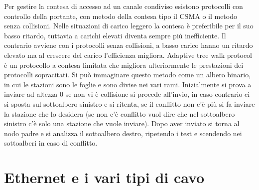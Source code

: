 Per gestire la contesa di accesso ad un canale condiviso esistono protocolli con controllo della portante, con metodo della contesa tipo il CSMA o il metodo senza collisioni. Nelle situazioni di carico leggero la contesa è preferibile per il suo basso ritardo, tuttavia a carichi elevati diventa sempre più inefficiente. Il contrario avviene con i protocolli senza collisioni, a basso carico hanno un ritardo elevato ma al crescere del carico l’efficienza migliora.
Adaptive tree walk protocol è un protocollo a contesa limitata che migliora ulteriormente le prestazioni dei protocolli sopracitati.
Si può immaginare questo metodo come un albero binario, in cui le stazioni sono le foglie e sono divise nei vari rami. Inizialmente si prova a inviare ad altezza 0 se non vi è collisione si procede all’invio, in caso contrario ci si sposta sul sottoalbero sinistro e si ritenta, se il conflitto non c’è più si fa inviare la stazione che lo desidera (se non c’è conflitto vuol dire che nel sottoalbero sinistro c’è solo una stazione che vuole inviare). Dopo aver inviato si torna al nodo padre e si analizza il sottoalbero destro, ripetendo i test e scendendo nei sottoalberi in caso di conflitto.
 
\section{Ethernet e i vari tipi di cavo}

